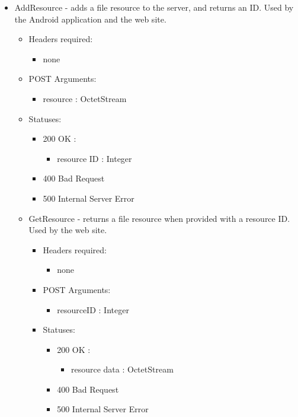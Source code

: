 \begin{itemize}
\begin{itemize}
\begin{itemize}
\begin{itemize}
        \item AddResource - adds a file resource to the server, and returns an ID. Used by the Android application and the web site.
        \begin{itemize}
        \item Headers required: 
        \begin{itemize}
            \item none
        \end{itemize}
        \item POST Arguments:
        \begin{itemize}
        	\item resource : OctetStream
        \end{itemize}
        \item Statuses:
        \begin{itemize}
        	\item 200 OK :
            \begin{itemize}
        		\item resource ID : Integer
            \end{itemize}
        	\item 400 Bad Request
        	\item 500 Internal Server Error
        \end{itemize}
	
        \item GetResource - returns a file resource when provided with a resource ID. Used by the web site.
        \begin{itemize}
        \item Headers required:
        \begin{itemize}
            \item none
        \end{itemize}
        \item POST Arguments:
        \begin{itemize}
        	\item resourceID : Integer
        \end{itemize}
        \item Statuses:
        \begin{itemize}
        	\item 200 OK : 
            \begin{itemize}
                \item resource data : OctetStream
            \end{itemize}
        	\item 400 Bad Request
        	\item 500 Internal Server Error
        \end{itemize}
	    \end{itemize}


\end{itemize}
\end{itemize}
\end{itemize}
\end{itemize}
\end{itemize}
